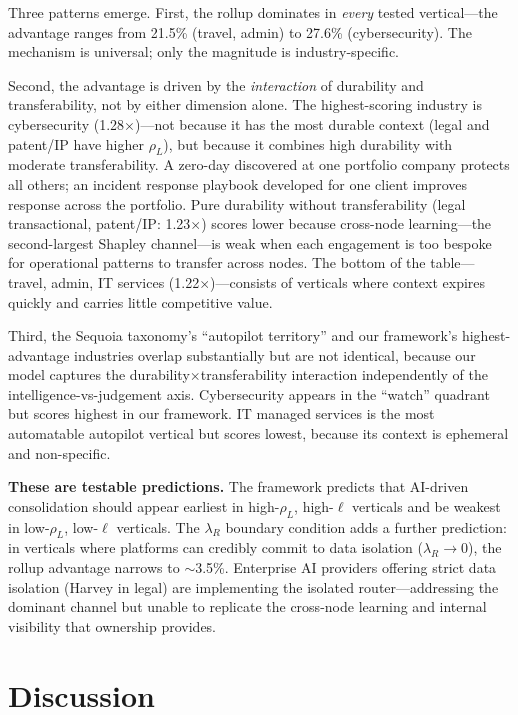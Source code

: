 \documentclass[12pt]{article}
\theoremstyle{definition}
\begin{document}
Three patterns emerge. First, the rollup dominates in \textit{every} tested vertical---the advantage ranges from 21.5\% (travel, admin) to 27.6\% (cybersecurity). The mechanism is universal; only the magnitude is industry-specific.

Second, the advantage is driven by the \textit{interaction} of durability and transferability, not by either dimension alone. The highest-scoring industry is cybersecurity (1.28$\times$)---not because it has the most durable context (legal and patent/IP have higher $\rho_L$), but because it combines high durability with moderate transferability. A zero-day discovered at one portfolio company protects all others; an incident response playbook developed for one client improves response across the portfolio. Pure durability without transferability (legal transactional, patent/IP: 1.23$\times$) scores lower because cross-node learning---the second-largest Shapley channel---is weak when each engagement is too bespoke for operational patterns to transfer across nodes. The bottom of the table---travel, admin, IT services (1.22$\times$)---consists of verticals where context expires quickly and carries little competitive value.

Third, the Sequoia taxonomy's ``autopilot territory'' and our framework's highest-advantage industries overlap substantially but are not identical, because our model captures the durability$\times$transferability interaction independently of the intelligence-vs-judgement axis. Cybersecurity appears in the ``watch'' quadrant but scores highest in our framework. IT managed services is the most automatable autopilot vertical but scores lowest, because its context is ephemeral and non-specific.

\textbf{These are testable predictions.} The framework predicts that AI-driven consolidation should appear earliest in high-$\rho_L$, high-$\ell$ verticals and be weakest in low-$\rho_L$, low-$\ell$ verticals. The $\lambda_R$ boundary condition adds a further prediction: in verticals where platforms can credibly commit to data isolation ($\lambda_R \to 0$), the rollup advantage narrows to $\sim$3.5\%. Enterprise AI providers offering strict data isolation (Harvey in legal) are implementing the isolated router---addressing the dominant channel but unable to replicate the cross-node learning and internal visibility that ownership provides.

\section{Discussion}
\end{document}

